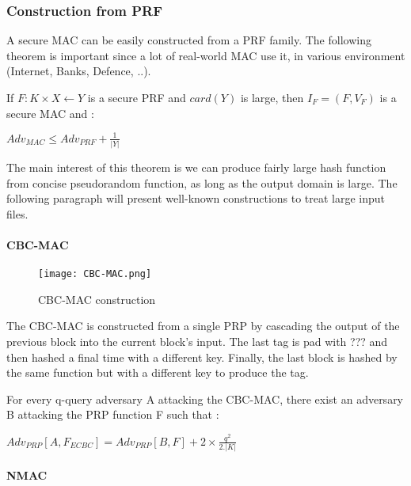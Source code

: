 \subsubsection{Construction from PRF}

A secure MAC can be easily constructed from a PRF family. The following theorem is important since a lot of real-world MAC use it, in various environment (Internet, Banks, Defence, ..). 

\begin{mytheorem}
    If $F:K\times X \leftarrow Y$ is a secure PRF and $card(Y)$ is large, then $I_F = (F, V_F)$ is a secure MAC and : 
   	\begin{flushright}
	    $ Adv_{MAC} \leq Adv_{PRF} + \frac{1}{|Y|} $
	\end{flushright}
\end{mytheorem}

The main interest of this theorem is we can produce fairly large hash function from concise pseudorandom function, as long as the output domain is large. The following paragraph will present well-known constructions to treat large input files.

\paragraph{CBC-MAC}

\begin{figure}[h!]
	\centering
		\texttt{[image: CBC-MAC.png]}
	\caption{CBC-MAC construction}
	\label{fig:CBCMACConstruction}
\end{figure}

The CBC-MAC is constructed from a single PRP by cascading the output of the previous block into the current block's input. The last tag is pad with ??? and then hashed a final time with a different key. Finally, the last block is hashed by the same function but with a different key to produce the tag.

\begin{mytheorem}
	For every q-query adversary A attacking the CBC-MAC, there exist an adversary B attacking the PRP function F such that : 
	\begin{flushright}
 		$Adv_{PRP}[A,F_{ECBC}] = Adv_{PRP}[B, F] + 2\times \frac{q^2}{2.|K|}$	
	\end{flushright}
\end{mytheorem}



\paragraph{NMAC}


